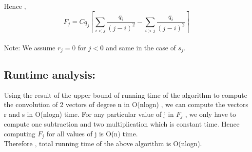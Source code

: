\documentclass{article}
\begin{document}
Hence , 
\[F_j = Cq_j[\sum_{i<j} \frac{q_{i}}{(j-i)^2} - \sum_{i>j} \frac{q_{i}}{(j-i)^2}  ]\] 
\\
Note: We assume $r_j = 0$ for $j < 0$ and same in the case of $s_j$.

\subsection*{Runtime analysis:}
Using the result of the upper bound of running time of the algorithm to compute the convolution of 2 vectors of degree n in O(nlogn) , we can compute the vectors r and s in O(nlogn) time.
For any particular value of j in $F_j$ , we only have to compute one subtraction and two multiplication which is constant time. Hence computing $F_j$ for all values of j is O(n) time. \\
Therefore , total running time of the above algorithm is O(nlogn).
\end{document}
